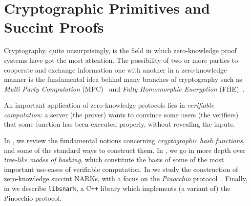 \chapter{Cryptographic Primitives and Succint Proofs}\label{chap:crypto}
Cryptography, quite unsurprisingly, is the field in which zero-knowledge proof systems have 
got the most attention.
The possibility of two or more parties to cooperate and exchange information one with another in a 
zero-knowledge manner is the fundamental idea behind many branches of cryptography such as 
\emph{Multi Party Computation} (MPC)~\cite{Yao1982-2} and \emph{Fully Homomorphic Encryption} 
(FHE)~\cite{ArmknechtEtAl2015}.

An important application of zero-knowledge protocols lies in \emph{verifiable computation}:
a server (the prover) wants to convince some users (the verifiers) that some function has been 
executed properly, without revealing the inputs.

In , we review the fundamental notions concerning 
\emph{cryptographic hash functions}, and some of the standard ways to construct them.
In , we go in more depth over \emph{tree-like modes of hashing}, which 
constitute the basis of some of the most important use-cases of verifiable computation.
In  we study the construction of zero-knowledge succint NARKs, with a focus on 
the \emph{Pinocchio} protocol~\cite{ParnoGHR2013}.
Finally, in  we describe \texttt{libsnark}, a C\texttt{++} library which 
implements (a variant of) the Pinocchio protocol. 






